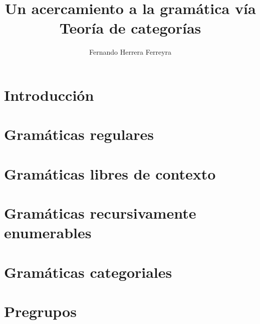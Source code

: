 \documentclass[letterpaper,spanish,12pt]{book}
\author{Fernando Herrera Ferreyra}
\title{Un acercamiento a la gramática vía Teoría de categorías}
\begin{document}
\frontmatter
\maketitle

\setcounter{page}{2}
\tableofcontents

\mainmatter

\chapter{Introducción}

	
\chapter{Gramáticas regulares}


\chapter{Gramáticas libres de contexto}


\chapter{Gramáticas recursivamente enumerables}


\chapter{Gramáticas categoriales}


\chapter{Pregrupos}


	
\end{document}
